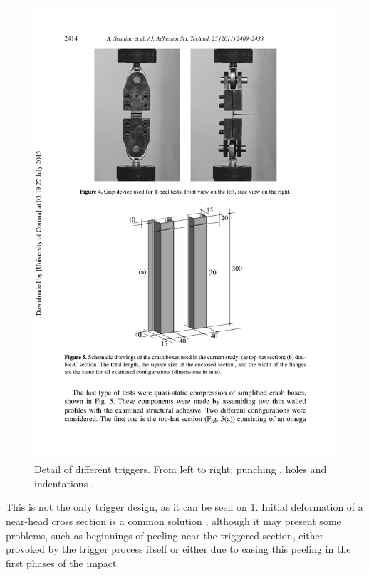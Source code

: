 \documentclass[
documentsize = a4, %
font = cmr, %
typesize = 11, %
printmode = true,
onehalfspacing = true,
language = en, %
titlepage = udciccp, %
degree = pt, %
dedication = true,
acknowledgements = true,
abstract-en = true,
abstract-es = false,
abstract-ga = false,
epigraphs = true,
toc = true,
lof = true,
lot = true,
frontmatterintoc = false,
notation = false,
minimal = false,
]{UDCthesis}
\begin{document}
\begin{figure}
\begin{minipage}[b]{.45\linewidth}
		\includegraphics[width=\linewidth]{IMG_CUTRES/scattina_trig}
	\end{minipage}
	\caption[Detail of different triggers: punching, holes and indentations.]{Detail of different triggers. From left to right: punching \citep{Abedrabbo2009}, holes \citep{Peroni2009} and indentations \citep{Scattina2011}.}
	\label{fig:different_trig}
\end{figure}

This is not the only trigger design, as it can be seen on \cref{fig:different_trig}. Initial deformation of a near-head cross section is a common solution \citep{Abedrabbo2009, Scattina2011, Costas2013}, although it may present some problems, such as beginnings of peeling near the triggered section, either provoked by the trigger process itself or either due to easing this peeling in the first phases of the impact.
\end{document}
